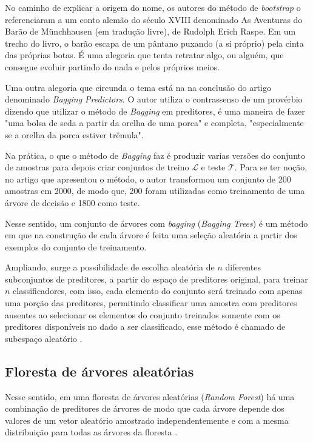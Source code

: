 \documentclass[12pt]{article}
\begin{document}
No caminho de explicar a origem do nome, os autores do método de \textit{bootstrap} \cite{Efron_1993} o referenciaram a um conto alemão do século XVIII denominado As Aventuras do Barão de Münchhausen (em tradução livre), de Rudolph Erich Raspe. Em um trecho do livro, o barão escapa de um pântano puxando (a si próprio) pela cinta das próprias botas. É uma alegoria que tenta retratar algo, ou alguém, que consegue evoluir partindo do nada e pelos próprios meios.

Uma outra alegoria que circunda o tema está na na conclusão do artigo denominado \emph{Bagging Predictors}. O autor \cite{Breiman_1996} utiliza o contrassenso de um provérbio dizendo que utilizar o método de \emph{Bagging} em preditores, é uma maneira de fazer "uma bolsa de seda a partir da orelha de uma porca" e completa, "especialmente se a orelha da porca estiver trêmula". 

Na prática, o que o método de \emph{Bagging} faz é produzir varias versões do conjunto de amostras para depois criar conjuntos de treino $\mathcal{L}$ e teste $\mathcal{T}$. Para se ter noção, no artigo que apresentou o método, o autor transformou um conjunto de 200 amostras em 2000, de modo que, 200 foram utilizadas como treinamento de uma árvore de decisão e 1800 como teste.

Nesse sentido, um conjunto de árvores com \textit{bagging} (\textit{Bagging Trees}) é um método em que na construção de cada árvore é feita uma seleção aleatória a partir dos exemplos do conjunto de treinamento. 

Ampliando, surge a possibilidade de escolha aleatória de $n$ diferentes subconjuntos de preditores, a partir do espaço de preditores original, para treinar $n$ classificadores, com isso, cada elemento do conjunto será treinado com apenas uma porção das preditores, permitindo classificar uma amostra com preditores ausentes ao selecionar os elementos do conjunto treinados somente com os preditores disponíveis no dado a ser classificado, esse método é chamado de subespaço aleatório \cite{polikar2010}. 

\subsection{Floresta de árvores aleatórias}

Nesse sentido, em uma floresta de árvores aleatórias (\textit{Random Forest}) há uma combinação de preditores de árvores de modo que cada árvore depende dos valores de um vetor aleatório amostrado independentemente e com a mesma distribuição para todas as árvores da floresta \cite{Breiman_2001}.
\end{document}
